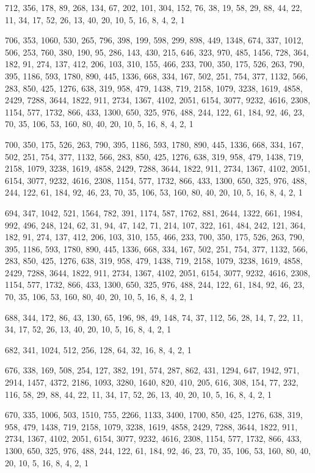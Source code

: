 \documentclass[12pt]{article}
\begin{document}
712, 356, 178, 89, 268, 134, 67, 202, 101, 304, 152, 76, 38, 19, 58, 29, 88, 44, 22, 11, 34, 17, 52, 26, 13, 40, 20, 10, 5, 16, 8, 4, 2, 1

706, 353, 1060, 530, 265, 796, 398, 199, 598, 299, 898, 449, 1348, 674, 337, 1012, 506, 253, 760, 380, 190, 95, 286, 143, 430, 215, 646, 323, 970, 485, 1456, 728, 364, 182, 91, 274, 137, 412, 206, 103, 310, 155, 466, 233, 700, 350, 175, 526, 263, 790, 395, 1186, 593, 1780, 890, 445, 1336, 668, 334, 167, 502, 251, 754, 377, 1132, 566, 283, 850, 425, 1276, 638, 319, 958, 479, 1438, 719, 2158, 1079, 3238, 1619, 4858, 2429, 7288, 3644, 1822, 911, 2734, 1367, 4102, 2051, 6154, 3077, 9232, 4616, 2308, 1154, 577, 1732, 866, 433, 1300, 650, 325, 976, 488, 244, 122, 61, 184, 92, 46, 23, 70, 35, 106, 53, 160, 80, 40, 20, 10, 5, 16, 8, 4, 2, 1

700, 350, 175, 526, 263, 790, 395, 1186, 593, 1780, 890, 445, 1336, 668, 334, 167, 502, 251, 754, 377, 1132, 566, 283, 850, 425, 1276, 638, 319, 958, 479, 1438, 719, 2158, 1079, 3238, 1619, 4858, 2429, 7288, 3644, 1822, 911, 2734, 1367, 4102, 2051, 6154, 3077, 9232, 4616, 2308, 1154, 577, 1732, 866, 433, 1300, 650, 325, 976, 488, 244, 122, 61, 184, 92, 46, 23, 70, 35, 106, 53, 160, 80, 40, 20, 10, 5, 16, 8, 4, 2, 1

694, 347, 1042, 521, 1564, 782, 391, 1174, 587, 1762, 881, 2644, 1322, 661, 1984, 992, 496, 248, 124, 62, 31, 94, 47, 142, 71, 214, 107, 322, 161, 484, 242, 121, 364, 182, 91, 274, 137, 412, 206, 103, 310, 155, 466, 233, 700, 350, 175, 526, 263, 790, 395, 1186, 593, 1780, 890, 445, 1336, 668, 334, 167, 502, 251, 754, 377, 1132, 566, 283, 850, 425, 1276, 638, 319, 958, 479, 1438, 719, 2158, 1079, 3238, 1619, 4858, 2429, 7288, 3644, 1822, 911, 2734, 1367, 4102, 2051, 6154, 3077, 9232, 4616, 2308, 1154, 577, 1732, 866, 433, 1300, 650, 325, 976, 488, 244, 122, 61, 184, 92, 46, 23, 70, 35, 106, 53, 160, 80, 40, 20, 10, 5, 16, 8, 4, 2, 1

688, 344, 172, 86, 43, 130, 65, 196, 98, 49, 148, 74, 37, 112, 56, 28, 14, 7, 22, 11, 34, 17, 52, 26, 13, 40, 20, 10, 5, 16, 8, 4, 2, 1

682, 341, 1024, 512, 256, 128, 64, 32, 16, 8, 4, 2, 1

676, 338, 169, 508, 254, 127, 382, 191, 574, 287, 862, 431, 1294, 647, 1942, 971, 2914, 1457, 4372, 2186, 1093, 3280, 1640, 820, 410, 205, 616, 308, 154, 77, 232, 116, 58, 29, 88, 44, 22, 11, 34, 17, 52, 26, 13, 40, 20, 10, 5, 16, 8, 4, 2, 1

670, 335, 1006, 503, 1510, 755, 2266, 1133, 3400, 1700, 850, 425, 1276, 638, 319, 958, 479, 1438, 719, 2158, 1079, 3238, 1619, 4858, 2429, 7288, 3644, 1822, 911, 2734, 1367, 4102, 2051, 6154, 3077, 9232, 4616, 2308, 1154, 577, 1732, 866, 433, 1300, 650, 325, 976, 488, 244, 122, 61, 184, 92, 46, 23, 70, 35, 106, 53, 160, 80, 40, 20, 10, 5, 16, 8, 4, 2, 1
\end{document}
